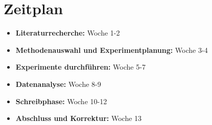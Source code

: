 \section{Zeitplan}

\begin{itemize}
    \item \textbf{Literaturrecherche:} Woche 1-2
    \item \textbf{Methodenauswahl und Experimentplanung:} Woche 3-4
    \item \textbf{Experimente durchführen:} Woche 5-7
    \item \textbf{Datenanalyse:} Woche 8-9
    \item \textbf{Schreibphase:} Woche 10-12
    \item \textbf{Abschluss und Korrektur:} Woche 13
\end{itemize}\cite{AiTest}
